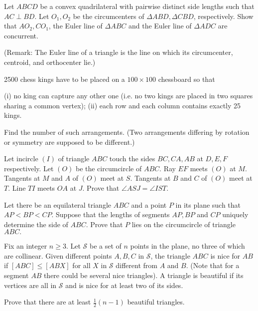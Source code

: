 \documentclass[11pt]{scrartcl}
\begin{document}
\begin{problem}[8963205841174892420]
	Let $ABCD$ be a convex quadrilateral with pairwise distinct side lengths such that $AC\perp BD$. Let $O_1,O_2$ be the circumcenters of $\Delta ABD, \Delta CBD$, respectively. Show that $AO_2, CO_1$, the Euler line of $\Delta ABC$ and the Euler line of $\Delta ADC$ are concurrent.

(Remark: The Euler line of a triangle is the line on which its circumcenter, centroid, and orthocenter lie.)
\end{problem}
\begin{problem}[8971817929368411167]
2500 chess kings have to be placed on a $100 \times 100$ chessboard so that

(i) no king can capture any other one (i.e. no two kings are placed in two squares sharing a common vertex);
(ii) each row and each column contains exactly 25 kings.

Find the number of such arrangements. (Two arrangements differing by rotation or symmetry are supposed to be different.)
\end{problem}
\begin{problem}[8972547734710795566]
Let incircle $(I)$ of triangle $ABC$ touch the sides $BC,CA,AB$ at $D,E,F$ respectively. Let $(O)$ be the circumcircle of $ABC$. Ray $EF$ meets $(O)$ at $M$. Tangents at $M$ and $A$ of $(O)$ meet at $S$. Tangents at $B$ and $C$ of $(O)$ meet at $T$. Line $TI$ meets $OA$ at $J$. Prove that $\angle ASJ=\angle IST$.
\end{problem}
\begin{problem}[8982900673855870942]
Let there be an equilateral triangle $ABC$ and a point $P$ in its plane such that $AP<BP<CP.$ Suppose that the lengths of segments $AP,BP$ and $CP$ uniquely determine the side of $ABC$. Prove that $P$ lies on the circumcircle of triangle $ABC.$
\end{problem}
\begin{problem}[9000483733039705317]
Fix an integer $n \geq 3$. Let $\mathcal{S}$ be a set of $n$ points in the plane, no three of which are collinear. Given different points $A,B,C$ in $\mathcal{S}$, the triangle $ABC$ is nice for $AB$ if $[ABC] \leq [ABX]$ for all $X$ in $\mathcal{S}$ different from $A$ and $B$. (Note that for a segment $AB$ there could be several nice triangles). A triangle is beautiful if its vertices are all in $\mathcal{S}$ and is nice for at least two of its sides.

Prove that there are at least $\frac{1}{2}(n-1)$ beautiful triangles.
\end{problem}
\end{document}
